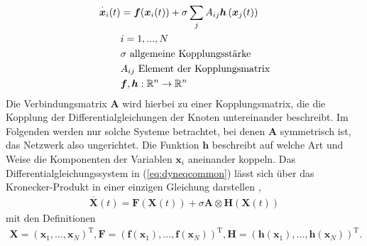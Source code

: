 \begin{align}\label{eq:dyneqcommon}
\overset{\cdot}{\boldsymbol{x}}_i(t)&=\boldsymbol{f}(\boldsymbol{x}_i(t))+\sigma\sum_j A_{ij}\boldsymbol{h}\left(\boldsymbol{x}_j(t)\right)
\\\notag & i=1,...,N
\\\notag & \sigma \text{ allgemeine Kopplungsstärke}
\\\notag & A_{ij}\text{ Element der Kopplungsmatrix}
\\\notag & \boldsymbol{f},\boldsymbol{h}:\mathbb{R}^n\rightarrow\mathbb{R}^n
\end{align}
Die Verbindungsmatrix $\boldsymbol{A}$ wird hierbei zu einer Kopplungsmatrix, die die Kopplung der Differentialgleichungen der Knoten untereinander beschreibt. Im Folgenden werden nur solche Systeme betrachtet, bei denen $\boldsymbol{A}$ symmetrisch ist, das Netzwerk also ungerichtet. Die Funktion $\boldsymbol{h}$ beschreibt auf welche Art und Weise die Komponenten der Variablen $\boldsymbol{x}_i$ aneinander koppeln. Das Differentialgleichungssystem in (\ref{eq:dyneqcommon}) lässt sich über das Kronecker-Produkt in einer einzigen Gleichung darstellen \cite{kronecker},
\begin{align}
\overset{\cdot}{\boldsymbol{X}}(t)=\boldsymbol{F}(\boldsymbol{X}(t))+\sigma\boldsymbol{A}\otimes\boldsymbol{H}(\boldsymbol{X}(t))
\end{align}
mit den Definitionen
\begin{align*}
\boldsymbol{X}=\left(\boldsymbol{x}_1,...,\boldsymbol{x}_N\right)^{\text{T}},
\boldsymbol{F}=\left(\boldsymbol{f}(\boldsymbol{x}_1),...,\boldsymbol{f}(\boldsymbol{x}_N)\right)^{\text{T}},
\boldsymbol{H}=\left(\boldsymbol{h}(\boldsymbol{x}_1),...,\boldsymbol{h}(\boldsymbol{x}_N)\right)^{\text{T}}.
\end{align*}
